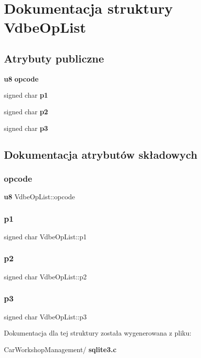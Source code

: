 \section{Dokumentacja struktury Vdbe\+Op\+List}
\label{struct_vdbe_op_list}
\subsection*{Atrybuty publiczne}
\begin{DoxyCompactItemize}
\item 
\textbf{ u8} \textbf{ opcode}
\item 
signed char \textbf{ p1}
\item 
signed char \textbf{ p2}
\item 
signed char \textbf{ p3}
\end{DoxyCompactItemize}


\subsection{Dokumentacja atrybutów składowych}
\mbox{\label{struct_vdbe_op_list_a9c839a619aed99f91cb5e226487be7be}} 
\subsubsection{opcode}
{\footnotesize\ttfamily \textbf{ u8} Vdbe\+Op\+List\+::opcode}

\mbox{\label{struct_vdbe_op_list_a68641ef4313dfdfafe45b75203c49d5a}} 
\subsubsection{p1}
{\footnotesize\ttfamily signed char Vdbe\+Op\+List\+::p1}

\mbox{\label{struct_vdbe_op_list_a8493431402f7f91cea81c00e311dc4e1}} 
\subsubsection{p2}
{\footnotesize\ttfamily signed char Vdbe\+Op\+List\+::p2}

\mbox{\label{struct_vdbe_op_list_a584cdaa02042fd5d1bc8cffbdfd9441d}} 
\subsubsection{p3}
{\footnotesize\ttfamily signed char Vdbe\+Op\+List\+::p3}



Dokumentacja dla tej struktury została wygenerowana z pliku\+:\begin{DoxyCompactItemize}
\item 
Car\+Workshop\+Management/\textbf{ sqlite3.\+c}\end{DoxyCompactItemize}
